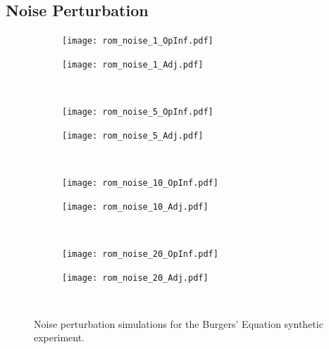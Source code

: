 
\subsection*{Noise Perturbation}

\vspace{1.0cm}

\begin{figure}[h!]
  \centering
  \begin{subfigure}[c]{0.49\textwidth}
      \centering
      \texttt{[image: rom\_noise\_1\_OpInf.pdf]}
  \end{subfigure}
  \begin{subfigure}[c]{0.49\textwidth}
      \centering
      \texttt{[image: rom\_noise\_1\_Adj.pdf]}
  \end{subfigure} \\[1ex]
    
  \begin{subfigure}[c]{0.49\textwidth}
      \centering
      \texttt{[image: rom\_noise\_5\_OpInf.pdf]}
  \end{subfigure} 
  \begin{subfigure}[c]{0.49\textwidth}
      \centering
      \texttt{[image: rom\_noise\_5\_Adj.pdf]}
  \end{subfigure} \\[1ex]
    
  \begin{subfigure}[c]{0.49\textwidth}
      \centering
      \texttt{[image: rom\_noise\_10\_OpInf.pdf]}
  \end{subfigure} 
  \begin{subfigure}[c]{0.49\textwidth}
      \centering
      \texttt{[image: rom\_noise\_10\_Adj.pdf]}
  \end{subfigure} \\[1ex]
    
  \begin{subfigure}[c]{0.49\textwidth}
      \centering
      \texttt{[image: rom\_noise\_20\_OpInf.pdf]}
  \end{subfigure} 
  \begin{subfigure}[c]{0.49\textwidth}
      \centering
      \texttt{[image: rom\_noise\_20\_Adj.pdf]}
  \end{subfigure} \\[1ex]
  \caption{Noise perturbation simulations for the Burgers' Equation synthetic experiment.}
  \label{fig:five_by_two3}
\end{figure}

